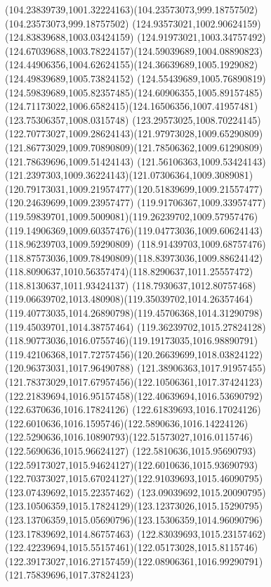 {{		\curveto(104.23839739,1001.32224163)(104.23573073,999.18757502)(104.23573073,999.18757502)
		\lineto(124.93573021,1002.90624159)
		\lineto(124.83839688,1003.03424159)
		\curveto(124.91973021,1003.34757492)(124.67039688,1003.78224157)(124.59039689,1004.08890823)
		\curveto(124.44906356,1004.62624155)(124.36639689,1005.1929082)(124.49839689,1005.73824152)
		\curveto(124.55439689,1005.76890819)(124.59839689,1005.82357485)(124.60906355,1005.89157485)
		\curveto(124.71173022,1006.6582415)(124.16506356,1007.41957481)(123.75306357,1008.0315748)
		\curveto(123.29573025,1008.70224145)(122.70773027,1009.28624143)(121.97973028,1009.65290809)
		\curveto(121.86773029,1009.70890809)(121.78506362,1009.61290809)(121.78639696,1009.51424143)
		\curveto(121.56106363,1009.53424143)(121.2397303,1009.36224143)(121.07306364,1009.3089081)
		\curveto(120.79173031,1009.21957477)(120.51839699,1009.21557477)(120.24639699,1009.23957477)
		\curveto(119.91706367,1009.33957477)(119.59839701,1009.5009081)(119.26239702,1009.57957476)
		\curveto(119.14906369,1009.60357476)(119.04773036,1009.60624143)(118.96239703,1009.59290809)
		\curveto(118.91439703,1009.68757476)(118.87573036,1009.78490809)(118.83973036,1009.88624142)
		\curveto(118.8090637,1010.56357474)(118.8290637,1011.25557472)(118.8130637,1011.93424137)
		\curveto(118.7930637,1012.80757468)(119.06639702,1013.480908)(119.35039702,1014.26357464)
		\curveto(119.40773035,1014.26890798)(119.45706368,1014.31290798)(119.45039701,1014.38757464)
		\curveto(119.36239702,1015.27824128)(118.90773036,1016.0755746)(119.19173035,1016.98890791)
		\curveto(119.42106368,1017.72757456)(120.26639699,1018.03824122)(120.96373031,1017.96490788)
		\curveto(121.38906363,1017.91957455)(121.78373029,1017.67957456)(122.10506361,1017.37424123)
		\curveto(122.21839694,1016.95157458)(122.40639694,1016.53690792)(122.6370636,1016.17824126)
		\curveto(122.61839693,1016.17024126)(122.6010636,1016.1595746)(122.5890636,1016.14224126)
		\curveto(122.5290636,1016.10890793)(122.51573027,1016.0115746)(122.5690636,1015.96624127)
		\curveto(122.5810636,1015.95690793)(122.59173027,1015.94624127)(122.6010636,1015.93690793)
		\curveto(122.70373027,1015.67024127)(122.91039693,1015.46090795)(123.07439692,1015.22357462)
		\curveto(123.09039692,1015.20090795)(123.10506359,1015.17824129)(123.12373026,1015.15290795)
		\curveto(123.13706359,1015.05690796)(123.15306359,1014.96090796)(123.17839692,1014.86757463)
		\curveto(122.83039693,1015.23157462)(122.42239694,1015.55157461)(122.05173028,1015.8115746)
		\curveto(122.39173027,1016.27157459)(122.08906361,1016.99290791)(121.75839696,1017.37824123)
}}
